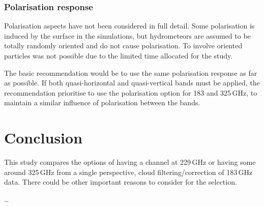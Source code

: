 \documentclass[12pt]{article}
\begin{document}
\subsubsection{Polarisation response}
%
Polarisation aspects have not been considered in full detail. Some polarisation
is induced by the surface in the simulations, but hydrometeors are assumed to
be totally randomly oriented and do not cause polarisation. To involve oriented
particles was not possible due to the limited time allocated for the study.

The basic recommendation would be to use the same polarisation response as far
as possible. If both quasi-horizontal and quasi-vertical bands must be applied,
the recommendation prioritise to use the polarisation option for 183 and
325\,GHz, to maintain a similar influence of polarisation between the bands.


\section{Conclusion}
%
This study compares the options of having a channel at 229\,GHz or having some
around 325\,GHz from a single perspective, cloud filtering/correction of
183\,GHz data. There could be other important reasons to consider for the
selection.

\dots


{\footnotesize

}
\end{document}
